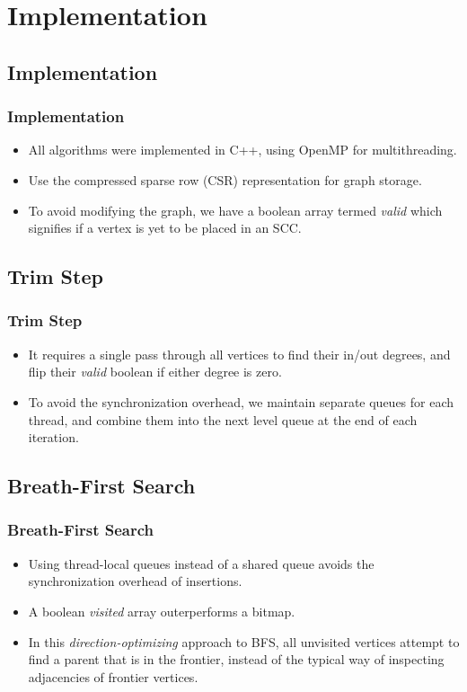 \section{Implementation}

\subsection{Implementation}
\begin{frame}
	\frametitle{Implementation}
	\begin{itemize}
		\setlength\itemsep{1em}
		\item All algorithms were implemented in C++, 
			using OpenMP for multithreading.
		\item Use the compressed sparse row (CSR) representation 
			for graph storage.
		\item To avoid modifying the graph, we have a boolean
			array termed \textit{valid} which signifies if a vertex is yet to be
			placed in an SCC.
	\end{itemize}
\end{frame}

\subsection{Trim Step}
\begin{frame}
	\frametitle{Trim Step}
	\begin{itemize}
		\setlength\itemsep{1em}
		\item It requires a single pass through all vertices to find 
			their in/out degrees, and flip their \textit{valid} boolean 
			if either degree is zero.
		\item To avoid the synchronization overhead, we maintain separate 
			queues for each thread, and combine them into the next level queue
			at the end of each iteration.
	\end{itemize}
\end{frame}

\subsection{Breath-First Search}
\begin{frame}
	\frametitle{Breath-First Search}
	\begin{itemize}
		\setlength\itemsep{1em}
		\item Using thread-local queues instead of a shared queue avoids the 
			synchronization overhead of insertions.
		\item A boolean \textit{visited} array outerperforms a bitmap.
		\item In this \textit{direction-optimizing} approach to BFS, all
			unvisited vertices attempt to find a parent that is in the 
			frontier, instead of the typical way of inspecting adjacencies of
			frontier vertices.
	\end{itemize}
\end{frame}

